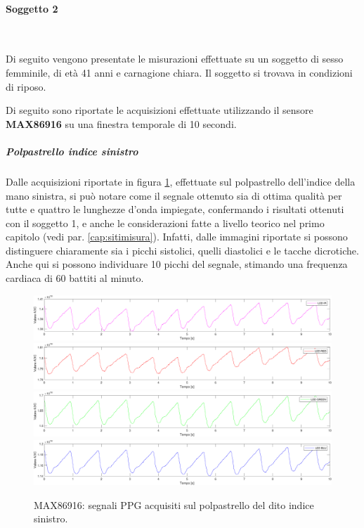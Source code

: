 \clearpage
\paragraph{Soggetto 2}~

Di seguito vengono presentate le misurazioni effettuate su un soggetto di sesso femminile, di età 41 anni e carnagione chiara. Il soggetto si trovava in condizioni di riposo.

\vspace{0.5cm}

\noindent Di seguito sono riportate le acquisizioni effettuate utilizzando il sensore \textbf{MAX86916} su una finestra temporale di 10 secondi.

\subparagraph{Polpastrello indice sinistro}
Dalle acquisizioni riportate in figura \ref{fig:soggetto2_MAX86916_polpastrello}, effettuate sul polpastrello dell'indice della mano sinistra, si può notare come il segnale ottenuto sia di ottima qualità per tutte e quattro le lunghezze d'onda impiegate, confermando i risultati ottenuti con il soggetto 1, e anche le considerazioni fatte a livello teorico nel primo capitolo (vedi par. \ref{cap:sitimisura}). Infatti, dalle immagini riportate si possono distinguere chiaramente sia i picchi sistolici, quelli diastolici e le tacche dicrotiche. Anche qui si possono individuare 10 picchi del segnale, stimando una frequenza cardiaca di 60 battiti al minuto.
\begin{figure}[h]
	\centering
	\includegraphics[width=1\linewidth]{ImageFiles/Misure Preliminari/Soggetto 2/max86916/polpastrello_ired}
	\includegraphics[width=1\linewidth]{ImageFiles/Misure Preliminari/Soggetto 2/max86916/polpastrello_red}
	\includegraphics[width=1\linewidth]{ImageFiles/Misure Preliminari/Soggetto 2/max86916/polpastrello_green}
	\includegraphics[width=1\linewidth]{ImageFiles/Misure Preliminari/Soggetto 2/max86916/polpastrello_blu}
	\caption{MAX86916: segnali PPG acquisiti sul polpastrello del dito indice sinistro.}
	\label{fig:soggetto2_MAX86916_polpastrello}
\end{figure}

